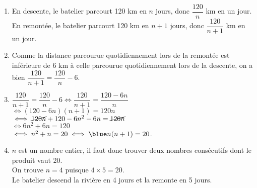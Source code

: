 \ \\ [-5mm]
   \begin{enumerate}
      \item En descente, le batelier parcourt 120 km en $n$ jours, donc {\blue $\dfrac{120}{n}$ km} en un jour. \\ [1mm]
         En remontée, le batelier parcourt 120 km en $n+1$ jours, donc {\blue $\dfrac{120}{n+1}$ km} en un jour. \\ [1mm]
      \item Comme la distance parcourue quotidiennement lors de la remontée est inférieure de 6 km à celle parcourue quotidiennement lors de la descente, on a bien {\blue $\dfrac{120}{n+1} =\dfrac{120}{n} - 6$}.
      \item $\dfrac{120}{n+1} =\dfrac{120}{n} - 6 \iff \dfrac{120}{n+1} =\dfrac{120-6n}{n}$ \\ [1mm]
         \hspace*{2.85cm} $\iff (120-6n)(n+1) =120n$ \\
         \hspace*{2.85cm} $\iff \cancel{120n}+120-6n^2-6n =\cancel{120n}$ \\
         \hspace*{2.85cm} $\iff 6n^2+6n =120$ \\
         \hspace*{2.85cm} $\iff n^2+n =20 \iff{\blue n (n + 1) = 20}$.
      \item $n$ est un nombre entier, il faut donc trouver deux nombres consécutifs dont le produit vaut 20. \\
         On trouve $n =4$ puisque $4\times5 =20$. \\
         {\blue Le batelier descend la rivière en 4 jours et la remonte en 5 jours}.
   \end{enumerate}
